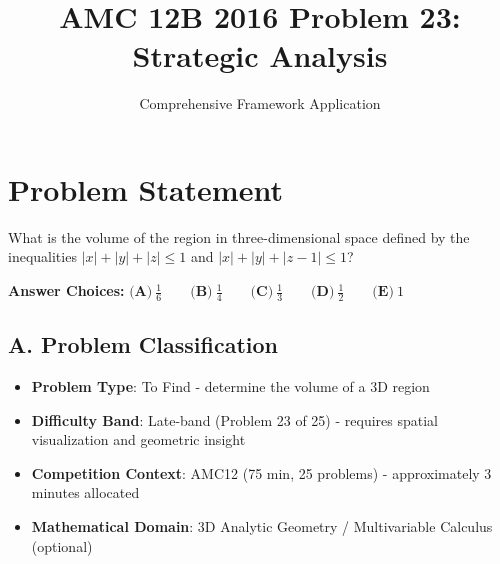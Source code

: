 \documentclass[11pt]{article}
\title{\textbf{AMC 12B 2016 Problem 23: Strategic Analysis}}
\author{Comprehensive Framework Application}
\date{}
\begin{document}
\maketitle

\section*{Problem Statement}
What is the volume of the region in three-dimensional space defined by the inequalities $|x|+|y|+|z|\le1$ and $|x|+|y|+|z-1|\le1$?

\textbf{Answer Choices:} 
$\textbf{(A)}\ \frac{1}{6}\qquad\textbf{(B)}\ \frac{1}{4}\qquad\textbf{(C)}\ \frac{1}{3}\qquad\textbf{(D)}\ \frac{1}{2}\qquad\textbf{(E)}\ 1$

\begin{problemconfigbox}
\subsection*{A. Problem Classification}
\begin{itemize}[leftmargin=*]
    \item \textbf{Problem Type}: To Find - determine the volume of a 3D region
    \item \textbf{Difficulty Band}: Late-band (Problem 23 of 25) - requires spatial visualization and geometric insight
    \item \textbf{Competition Context}: AMC12 (75 min, 25 problems) - approximately 3 minutes allocated
    \item \textbf{Mathematical Domain}: 3D Analytic Geometry / Multivariable Calculus (optional)
\end{itemize}


\end{problemconfigbox}
\end{document}
